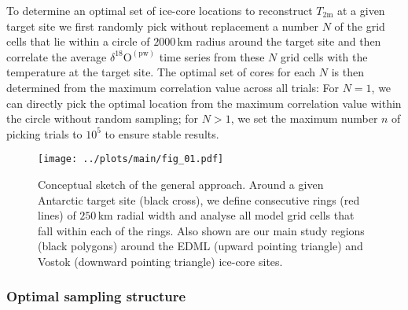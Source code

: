 \documentclass[cp, manuscript]{copernicus}
\begin{document}
To determine an optimal set of ice-core locations to reconstruct
$T_{2\mathrm{m}}$ at a given target site we first randomly pick without
replacement a number $N$ of the grid cells that lie within a circle of
$2000$\,km radius around the target site and then correlate the average
$\delta^{18}\mathrm{O}^{\mathrm{(pw)}}$ time series from these $N$ grid cells
with the temperature at the target site. The optimal set of cores for each $N$
is then determined from the maximum correlation value across all trials: For
$N=1$, we can directly pick the optimal location from the maximum correlation
value within the circle without random sampling; for $N>1$, we set the maximum
number $n$ of picking trials to $10^5$ to ensure stable results.

\begin{figure}[t]%
\centering
\texttt{[image: ../plots/main/fig\_01.pdf]}
\caption[Conceptual approach]{%
  Conceptual sketch of the general approach. Around a given Antarctic target
  site (black cross), we define consecutive rings (red lines) of $250$\,km
  radial width and analyse all model grid cells that fall within each of the
  rings. Also shown are our main study regions (black polygons) around the EDML
  (upward pointing triangle) and Vostok (downward pointing triangle) ice-core
  sites.}
\label{fig:concept}%
\end{figure}%

\subsubsection{Optimal sampling structure}\label{methods:opt.sampling}
\end{document}
